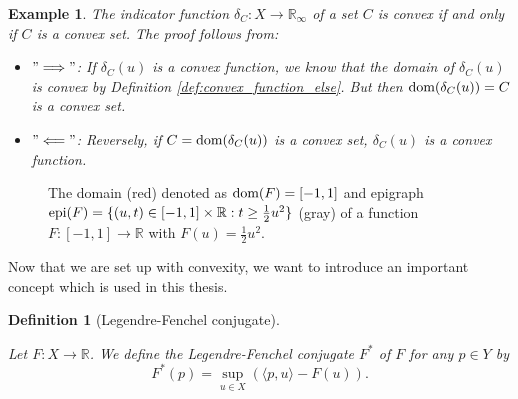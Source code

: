 \documentclass[abstracton]{scrreprt}
\newtheorem{definition}[theorem]{Definition}
\newtheorem{example}[theorem]{Example}
\begin{document}
        \begin{example}
            \label{ex:convex_function_reloaded}
            The indicator function $\delta_{C}: X \to \mathbb{R}_{\infty}$ of a set $C$ is convex if and only if $C$ is a convex set. The proof follows from:
                \begin{itemize}
                    \item[] $"\Longrightarrow"$: If $\delta_{C}(u)$ is a convex function, we know that the domain of $\delta_{C}(u)$ is convex by Definition \ref{def:convex_function_else}. But then $\textnormal{dom}(\delta_{C}(u)) = C$ is a convex set.
                    \item[] $"\Longleftarrow"$: Reversely, if $C = \textnormal{dom}(\delta_{C}(u))$ is a convex set, $\delta_{C}(u)$ is a convex function.
                \end{itemize}
        \end{example}
        \begin{figure}[!ht]
            \centering
            \caption[Domain and Epigraph.]{The domain (red) denoted as $\textnormal{dom}(F) = [-1, 1]$ and epigraph \\$\textnormal{epi}(F) = \{(u, t) \in [-1, 1] \times \mathbb{R} : t \ge \frac{1}{2}u^{2}\}$ (gray) of a function $F: [-1, 1] \longrightarrow \mathbb{R}$ with $F(u) = \frac{1}{2}u^{2}$.}
            \label{fig:domain_epigraph}
        \end{figure}
        Now that we are set up with convexity, we want to introduce an important concept which is used in this thesis.
        \begin{definition}[Legendre-Fenchel conjugate] %
        \label{def:legendre_fenchel_conjugate}

            Let $F: X \longrightarrow \mathbb{R}$. We define the Legendre-Fenchel conjugate $F^{\ast}$ of $F$ for any $p \in Y$ by
                \begin{equation}
                    F^{\ast}(p) = \sup_{u \in X} \left( \langle p, u \rangle - F(u) \right).
                    \label{eq:legendre_fenchel_conjugate}
                \end{equation}

        \end{definition}
\end{document}
